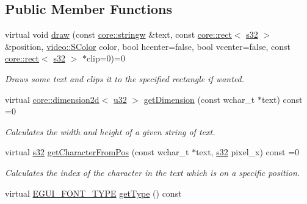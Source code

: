 \subsection*{Public Member Functions}
\begin{DoxyCompactItemize}
\item 
virtual void \hyperlink{classirr_1_1gui_1_1IGUIFont_af5627e546c474f31260fe671c24f9a33}{draw} (const \hyperlink{namespaceirr_1_1core_a5aedb62cb47cf01d1c548ab5e6344d2d}{core\+::stringw} \&text, const \hyperlink{classirr_1_1core_1_1rect}{core\+::rect}$<$ \hyperlink{namespaceirr_ac66849b7a6ed16e30ebede579f9b47c6}{s32} $>$ \&position, \hyperlink{classirr_1_1video_1_1SColor}{video\+::\+S\+Color} color, bool hcenter=false, bool vcenter=false, const \hyperlink{classirr_1_1core_1_1rect}{core\+::rect}$<$ \hyperlink{namespaceirr_ac66849b7a6ed16e30ebede579f9b47c6}{s32} $>$ $\ast$clip=0)=0
\begin{DoxyCompactList}\small\item\em Draws some text and clips it to the specified rectangle if wanted. \end{DoxyCompactList}\item 
virtual \hyperlink{classirr_1_1core_1_1dimension2d}{core\+::dimension2d}$<$ \hyperlink{namespaceirr_a0416a53257075833e7002efd0a18e804}{u32} $>$ \hyperlink{classirr_1_1gui_1_1IGUIFont_aa7612db0c9dc2837b44a1a2fa5668797}{get\+Dimension} (const wchar\+\_\+t $\ast$text) const =0
\begin{DoxyCompactList}\small\item\em Calculates the width and height of a given string of text. \end{DoxyCompactList}\item 
virtual \hyperlink{namespaceirr_ac66849b7a6ed16e30ebede579f9b47c6}{s32} \hyperlink{classirr_1_1gui_1_1IGUIFont_a60d4d0465deedd811cd0fecd11b4329f}{get\+Character\+From\+Pos} (const wchar\+\_\+t $\ast$text, \hyperlink{namespaceirr_ac66849b7a6ed16e30ebede579f9b47c6}{s32} pixel\+\_\+x) const =0
\begin{DoxyCompactList}\small\item\em Calculates the index of the character in the text which is on a specific position. \end{DoxyCompactList}\item 
\mbox{\label{classirr_1_1gui_1_1IGUIFont_a3d5a42997a718b510b73e7d6235b993e}} 
virtual \hyperlink{namespaceirr_1_1gui_a3c818a164486f43300260327c5420a2f}{E\+G\+U\+I\+\_\+\+F\+O\+N\+T\+\_\+\+T\+Y\+PE} \hyperlink{classirr_1_1gui_1_1IGUIFont_a3d5a42997a718b510b73e7d6235b993e}{get\+Type} () const

\end{DoxyCompactItemize}
